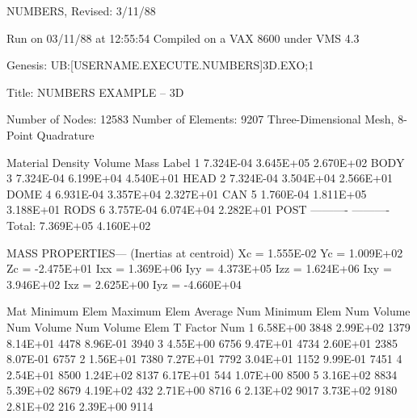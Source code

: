      NUMBERS, Revised:  3/11/88

     Run on 03/11/88 at 12:55:54
     Compiled on a VAX 8600 under VMS 4.3

     Genesis: UB:[USERNAME.EXECUTE.NUMBERS]3D.EXO;1

     Title:    NUMBERS EXAMPLE -- 3D

     Number of Nodes:     12583
     Number of Elements:   9207
     Three-Dimensional Mesh, 8-Point Quadrature

     Material    Density        Volume          Mass        Label
         1      7.324E-04      3.645E+05      2.670E+02     BODY            
         3      7.324E-04      6.199E+04      4.540E+01     HEAD            
         2      7.324E-04      3.504E+04      2.566E+01     DOME            
         4      6.931E-04      3.357E+04      2.327E+01     CAN             
         5      1.760E-04      1.811E+05      3.188E+01     RODS            
         6      3.757E-04      6.074E+04      2.282E+01     POST            
                              ----------     ----------
                  Total:       7.369E+05      4.160E+02

     MASS PROPERTIES--- (Inertias at centroid)
      Xc =  1.555E-02   Yc =  1.009E+02   Zc = -2.475E+01
     Ixx =  1.369E+06  Iyy =  4.373E+05  Izz =  1.624E+06
     Ixy =  3.946E+02  Ixz =  2.625E+00  Iyz = -4.660E+04

     Mat  Minimum   Elem   Maximum   Elem   Average   Num    Minimum   Elem
     Num   Volume   Num     Volume   Num     Volume   Elem   T Factor  Num
      1   6.58E+00  3848   2.99E+02  1379   8.14E+01  4478   8.96E-01  3940
      3   4.55E+00  6756   9.47E+01  4734   2.60E+01  2385   8.07E-01  6757
      2   1.56E+01  7380   7.27E+01  7792   3.04E+01  1152   9.99E-01  7451
      4   2.54E+01  8500   1.24E+02  8137   6.17E+01   544   1.07E+00  8500
      5   3.16E+02  8834   5.39E+02  8679   4.19E+02   432   2.71E+00  8716
      6   2.13E+02  9017   3.73E+02  9180   2.81E+02   216   2.39E+00  9114
